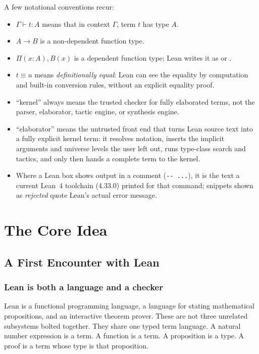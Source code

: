 \documentclass[10pt,letterpaper,oneside,openany]{report}
\newcommand{\term}[1]{\texttt{\detokenize{#1}}}
\newcommand{\defeq}{\mathrel{\equiv}}
\begin{document}
A few notational conventions recur:

\begin{itemize}
\item $\Gamma \vdash t : A$ means that in context $\Gamma$, term $t$ has type $A$.
\item $A \to B$ is a non-dependent function type.
\item $\Pi (x : A), B(x)$ is a dependent function type; Lean writes it as \term{(x : A) → B x} or \term{∀ x : A, B x}.
\item $t \defeq u$ means \emph{definitionally equal}: Lean can see the equality by computation and built-in conversion rules, without an explicit equality proof.
\item ``kernel'' always means the trusted checker for fully elaborated terms, not the parser, elaborator, tactic engine, or synthesis engine.
\item ``elaborator'' means the untrusted front end that turns Lean source text into a fully explicit kernel term: it resolves notation, inserts the implicit arguments and universe levels the user left out, runs type-class search and tactics, and only then hands a complete term to the kernel.
\item Where a Lean box shows output in a comment (\texttt{-\kern0pt- ...}), it is the text a current Lean~4 toolchain (4.33.0) printed for that command; snippets shown as \emph{rejected} quote Lean's actual error message.
\end{itemize}

\tableofcontents
\clearpage
{}
\hypersetup{pageanchor=true}

\part{The Core Idea}

\chapter{A First Encounter with Lean}\label{ch:first-lean}

\section{Lean is both a language and a checker}

Lean is a functional programming language, a language for stating mathematical propositions, and an interactive theorem prover.  These are not three unrelated subsystems bolted together.  They share one typed term language.  A natural number expression is a term.  A function is a term.  A proposition is a type.  A proof is a term whose type is that proposition.
\end{document}
